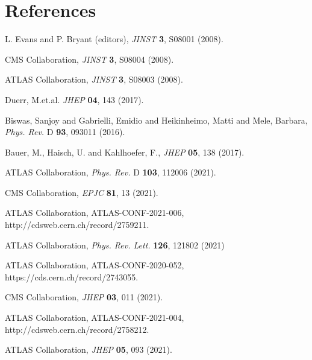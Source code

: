 \documentclass{moriond}
\def\Journal#1#2#3#4{{#1} {\bf #2}, #3 (#4)}
\def\PRL{\em Phys. Rev. Lett.}
\def\PRD{{\em Phys. Rev.} D}
\def\JINST{\em JINST}
\def\JHEP{\em JHEP}
\def\EPJC{\em EPJC}
\begin{document}
\section*{References}

\begin{thebibliography}{99}

L. Evans and P. Bryant (editors), \Journal{\JINST}{3}{S08001}{2008}.

CMS Collaboration, \Journal{\JINST}{3}{S08004}{2008}.

ATLAS Collaboration, \Journal{\JINST}{3}{S08003}{2008}.

Duerr, M.et.al. \Journal{\JHEP}{04}{143}{2017}.

Biswas, Sanjoy and Gabrielli, Emidio and Heikinheimo, Matti and Mele, Barbara, \Journal{\PRD}{93}{093011}{2016}.

Bauer, M., Haisch, U. and Kahlhoefer, F., \Journal{\JHEP}{05}{138}{2017}.

ATLAS Collaboration, \Journal{\PRD}{103}{112006}{2021}.

CMS Collaboration, \Journal{\EPJC}{81}{13}{2021}.

ATLAS Collaboration, ATLAS-CONF-2021-006, http://cdsweb.cern.ch/record/2759211. 

ATLAS Collaboration, \Journal{\PRL}{126}{121802}{2021} 

ATLAS Collaboration, ATLAS-CONF-2020-052, https://cds.cern.ch/record/2743055.

CMS Collaboration, \Journal{\JHEP}{03}{011}{2021}.

ATLAS Collaboration, ATLAS-CONF-2021-004, http://cdsweb.cern.ch/record/2758212.

ATLAS Collaboration, \Journal{\JHEP}{05}{093}{2021}.

\end{thebibliography}
\end{document}
